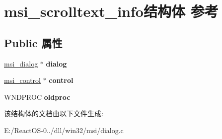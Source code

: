 \hypertarget{structmsi__scrolltext__info}{}\section{msi\+\_\+scrolltext\+\_\+info结构体 参考}
\label{structmsi__scrolltext__info}
\subsection*{Public 属性}
\begin{DoxyCompactItemize}
\item 
\mbox{\label{structmsi__scrolltext__info_a75836840b5b4aca6522732141f832e7f}} 
\hyperlink{structmsi__dialog__tag}{msi\+\_\+dialog} $\ast$ {\bfseries dialog}
\item 
\mbox{\label{structmsi__scrolltext__info_a960dd91e3a9a6e1a3f694509c7b61b2b}} 
\hyperlink{structmsi__control__tag}{msi\+\_\+control} $\ast$ {\bfseries control}
\item 
\mbox{\label{structmsi__scrolltext__info_aa90e204bbb141d220d26dd7d4589b8d3}} 
W\+N\+D\+P\+R\+OC {\bfseries oldproc}
\end{DoxyCompactItemize}


该结构体的文档由以下文件生成\+:\begin{DoxyCompactItemize}
\item 
E\+:/\+React\+O\+S-\/0../dll/win32/msi/dialog.\+c\end{DoxyCompactItemize}
